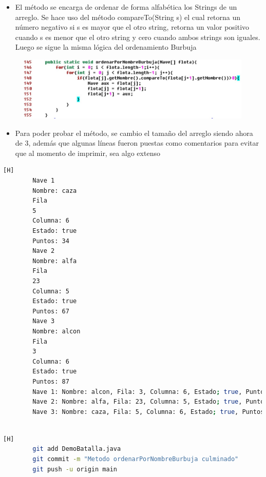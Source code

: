 \documentclass{article}
\begin{document}
	
	\begin{itemize}	
		\item El método se encarga de ordenar de forma alfabética los Strings de un arreglo. Se hace uso del método compareTo(String s) el cual retorna un número negativo si s es mayor que el otro string, retorna un valor positivo cuando s es menor que el otro string y cero cuando ambos strings son iguales. Luego se sigue la misma lógica del ordenamiento Burbuja
	\end{itemize}	
	
	
	
	\begin{figure}[H]
		\centering
		\includegraphics[width=1\textwidth,keepaspectratio]{img/4.jpg}
	\end{figure}
	
	\begin{itemize}	
		\item Para poder probar el método, se cambio el tamaño del arreglo siendo ahora de 3, además que algunas líneas fueron puestas como comentarios para evitar que al momento de imprimir, sea algo extenso
	\end{itemize}
	
	\begin{lstlisting}[language=bash,caption={Probando el metodo ordenarPorNombreBurbuja}][H]	
		Nave 1
		Nombre: caza
		Fila
		5
		Columna: 6
		Estado: true
		Puntos: 34
		Nave 2
		Nombre: alfa
		Fila
		23
		Columna: 5
		Estado: true
		Puntos: 67
		Nave 3
		Nombre: alcon
		Fila
		3
		Columna: 6
		Estado: true
		Puntos: 87
		Nave 1: Nombre: alcon, Fila: 3, Columna: 6, Estado; true, Puntos: 87
		Nave 2: Nombre: alfa, Fila: 23, Columna: 5, Estado; true, Puntos: 67
		Nave 3: Nombre: caza, Fila: 5, Columna: 6, Estado; true, Puntos: 34
		
	\end{lstlisting}
	\begin{lstlisting}[language=bash,caption={Commit:"Método ordenarPorNombreBurbuja culminado" }][H]
		git add DemoBatalla.java
		git commit -m "Metodo ordenarPorNombreBurbuja culminado"			
		git push -u origin main
	\end{lstlisting}
	
\end{document}
